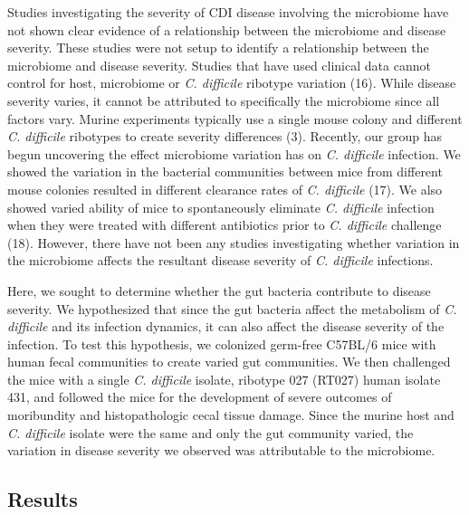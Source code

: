 \documentclass[
  12pt,
]{article}
\begin{document}
Studies investigating the severity of CDI disease involving the
microbiome have not shown clear evidence of a relationship between the
microbiome and disease severity. These studies were not setup to
identify a relationship between the microbiome and disease severity.
Studies that have used clinical data cannot control for host, microbiome
or \emph{C. difficile} ribotype variation (16). While disease severity
varies, it cannot be attributed to specifically the microbiome since all
factors vary. Murine experiments typically use a single mouse colony and
different \emph{C. difficile} ribotypes to create severity differences
(3). Recently, our group has begun uncovering the effect microbiome
variation has on \emph{C. difficile} infection. We showed the variation
in the bacterial communities between mice from different mouse colonies
resulted in different clearance rates of \emph{C. difficile} (17). We
also showed varied ability of mice to spontaneously eliminate \emph{C.
difficile} infection when they were treated with different antibiotics
prior to \emph{C. difficile} challenge (18). However, there have not
been any studies investigating whether variation in the microbiome
affects the resultant disease severity of \emph{C. difficile}
infections.

Here, we sought to determine whether the gut bacteria contribute to
disease severity. We hypothesized that since the gut bacteria affect the
metabolism of \emph{C. difficile} and its infection dynamics, it can
also affect the disease severity of the infection. To test this
hypothesis, we colonized germ-free C57BL/6 mice with human fecal
communities to create varied gut communities. We then challenged the
mice with a single \emph{C. difficile} isolate, ribotype 027 (RT027)
human isolate 431, and followed the mice for the development of severe
outcomes of moribundity and histopathologic cecal tissue damage. Since
the murine host and \emph{C. difficile} isolate were the same and only
the gut community varied, the variation in disease severity we observed
was attributable to the microbiome.

\hypertarget{results}{%
\subsection{Results}\label{results}}
\end{document}
